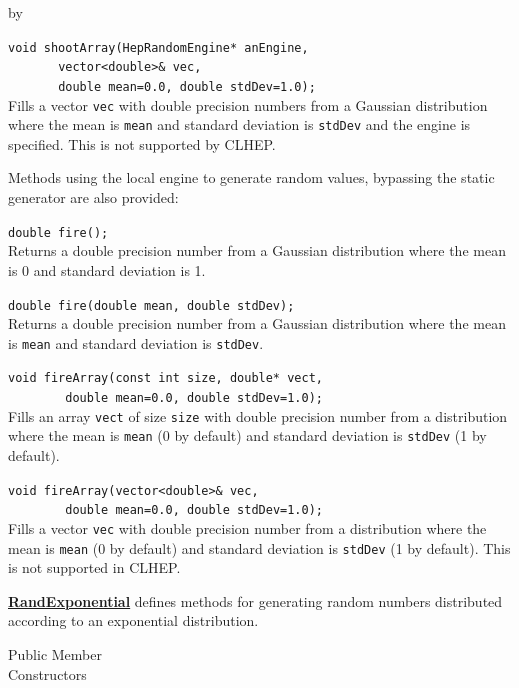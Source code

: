 \documentclass[twoside]{article}
\newcommand{\comp}[1]{\texttt{#1}}%
\newcommand{\entrylabel}[1]{\mbox{\textbf{{#1}}}\hfil}%
\newenvironment{entry}
{\begin{list}{}%
    {\renewcommand{\makelabel}{\entrylabel}%
     \setlength{\labelwidth}{90pt}%
     \setlength{\leftmargin}{\labelwidth}
     \advance\leftmargin by \labelsep%
      }%
    }%
  {\end{list}}
\newcommand{\Entrylabel}[1]%
{\raisebox{0pt}[1ex][0pt]{\makebox[\labelwidth][l]%
    {\parbox[t]{\labelwidth}{\hspace{0pt}\textbf{{#1}}}}}}
\newenvironment{Entry}%
{\renewcommand{\entrylabel}{\Entrylabel}\begin{entry}}%
  {\end{entry}}
\begin{document}
\begin{Entry}
  \verb+void shootArray(HepRandomEngine* anEngine,+\\
  \verb+       vector<double>& vec,+\\ 
  \verb+       double mean=0.0, double stdDev=1.0);+\\
  Fills a vector \comp{vec} with double precision
  numbers from a Gaussian distribution where the
  mean is \comp{mean} and standard deviation is \comp{stdDev}
  and the engine is specified.  This is not supported by CLHEP.
  
  Methods using the local engine to generate random values, bypassing
  the static generator are also provided:

  \verb+double fire();+\\
  Returns a double precision number from a Gaussian distribution where the
  mean is 0 and standard deviation is 1.
  
  \verb+double fire(double mean, double stdDev);+\\
  Returns a double precision number from a Gaussian distribution where the
  mean is \comp{mean} and standard deviation is \comp{stdDev}.
  
  \verb+void fireArray(const int size, double* vect,+\\
  \verb+        double mean=0.0, double stdDev=1.0);+\\
  Fills an array \comp{vect} of size \comp{size} with double
  precision number from a distribution where the
  mean is \comp{mean} (0 by default) and standard
  deviation is \comp{stdDev} (1 by default).

  \verb+void fireArray(vector<double>& vec,+\\
  \verb+        double mean=0.0, double stdDev=1.0);+\\
  Fills a vector \comp{vec} with double
  precision number from a distribution where the
  mean is \comp{mean} (0 by default) and standard
  deviation is \comp{stdDev} (1 by default).  This is not
  supported in CLHEP.
  
  \begin{description}
      \item \underline{\bf RandExponential}  defines methods for generating
        random numbers distributed according to an exponential distribution.
  \end{description}
      
\item[Public Member\\ Constructors]


\end{Entry}
\end{document}
